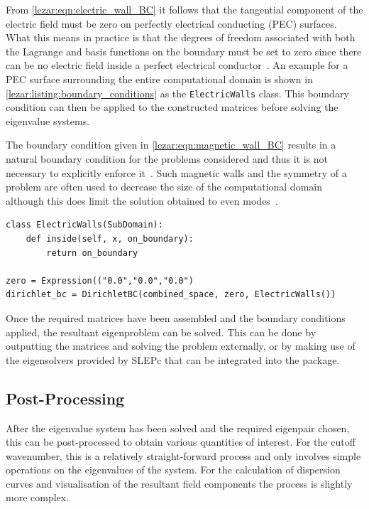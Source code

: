 From \eqref{lezar:eqn:electric_wall_BC} it follows that the tangential
component of the electric field must be zero on perfectly electrical
conducting (PEC) surfaces. What this means in practice is that the
degrees of freedom associated with both the Lagrange and \nedelec{}
basis functions on the boundary must be set to zero since there can be
no electric field inside a perfect electrical
conductor~\cite{Smi1997}. An example for a PEC surface surrounding the
entire computational domain is shown in \lstlistingname{}
\ref{lezar:listing:boundary_conditions} as the {\tt ElectricWalls}
class. This boundary condition can then be applied to the constructed
matrices before solving the eigenvalue systems.

The boundary condition given in \eqref{lezar:eqn:magnetic_wall_BC} results
in a natural boundary condition for the problems considered and thus
it is not necessary to explicitly enforce it~\cite{PelCoc1998}.  Such
magnetic walls and the symmetry of a problem are often used to
decrease the size of the computational domain although this does limit
the solution obtained to even modes~\cite{Jin2002}.

\begin{lstlisting}[float=h, caption=Boundary conditions., label=lezar:listing:boundary_conditions]
class ElectricWalls(SubDomain):
    def inside(self, x, on_boundary):
        return on_boundary

zero = Expression(("0.0","0.0","0.0")
dirichlet_bc = DirichletBC(combined_space, zero, ElectricWalls())
\end{lstlisting}

Once the required matrices have been assembled and the boundary
conditions applied, the resultant eigenproblem can be solved. This can
be done by outputting the matrices and solving the problem externally,
or by making use of the eigensolvers provided by SLEPc that can be
integrated into the \fenics{} package.

\subsection{Post-Processing}

After the eigenvalue system has been solved and the required eigenpair
chosen, this can be post-processed to obtain various quantities of
interest. For the cutoff wavenumber, this is
a relatively straight-forward process and only involves simple
operations on the eigenvalues of the system. For the calculation of
dispersion curves and visualisation of the resultant field components
the process is slightly more complex.

